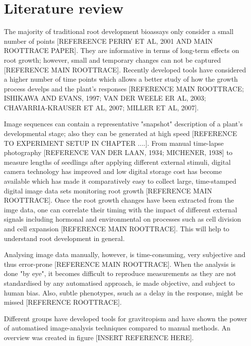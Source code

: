 \section{Literature review}

The majority of traditional root development bioassays only consider a small number of points [REFEREENCE PERRY ET AL, 2001 AND MAIN ROOTTRACE PAPER]. They are informative in terms of long-term effects on root growth; however, small and temporary changes can not be captured [REFERENCE MAIN ROOTTRACE].
Recently developed tools have considered a higher number of time points which allows a better study of how the growth process develps and the plant's responses [REFERENCE MAIN ROOTTRACE; ISHIKAWA AND EVANS, 1997; VAN DER WEELE ER AL, 2003; CHAVARRIA-KRAUSER ET AL, 2007; MILLER ET AL, 2007].  

Image sequences can contain a representative "snapshot" description of a plant's developmental stage; also they can be generated at high speed [REFERENCE TO EXPERIMENT SETUP IN CHAPTER ....]. From manual time-lapse photography [REFERENCE VAN DER LAAN, 1934; MICHENER, 1938] to measure lengths of seedlings after applying different external stimuli, digital camera  technology has improved and low digital storage cost has become available which has made it comparatively easy to collect large, time-stamped digital image data sets monitoring root growth [REFERENCE MAIN ROOTTRACE].  
Once the root growth changes have been extracted from the imge data, one can correlate their timing with the impact of different external signals including hormonal and environmental on processes such as cell division and cell expansion [REFERENCE MAIN ROOTTRACE]. This will help to understand root development in general. 

Analysing image data manually, however, is time-consuming, very subjective and thus error-prone [REFERENCE MAIN ROOTTRACE]. When the analysis is done "by eye", it becomes difficult to reproduce measurements as they are not standardised by any automatised approach, ie made objective, and subject to human bias. Also, subtle phenotypes, ssuch as a delay in the response, might be missed [REFERENCE ROOTTRACE]. 

Different groups have developed tools for gravitropism and have shown the power of automatised image-analysis techniques compared to manual methods. An overview was created in figure [INSERT REFERENCE HERE].


